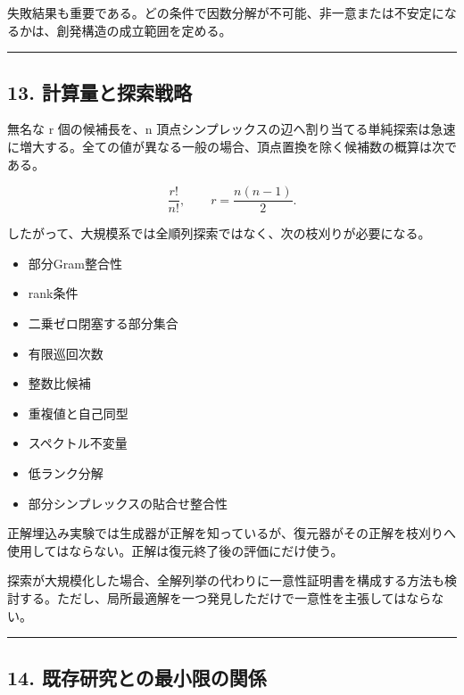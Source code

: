 \documentclass[
  a4paper,
]{ltjsarticle}
\providecommand{\tightlist}{%
  \setlength{\itemsep}{0pt}\setlength{\parskip}{0pt}}
\begin{document}
失敗結果も重要である。どの条件で因数分解が不可能、非一意または不安定になるかは、創発構造の成立範囲を定める。

\begin{center}\rule{0.5\linewidth}{0.5pt}\end{center}

\subsection{13.
計算量と探索戦略}\label{ux8a08ux7b97ux91cfux3068ux63a2ux7d22ux6226ux7565}

無名な r 個の候補長を、n
頂点シンプレックスの辺へ割り当てる単純探索は急速に増大する。全ての値が異なる一般の場合、頂点置換を除く候補数の概算は次である。

\[
\frac{r!}{n!},
\qquad
r=\frac{n(n-1)}{2}.
\]

したがって、大規模系では全順列探索ではなく、次の枝刈りが必要になる。

\begin{itemize}
\tightlist
\item
  部分Gram整合性
\item
  rank条件
\item
  二乗ゼロ閉塞する部分集合
\item
  有限巡回次数
\item
  整数比候補
\item
  重複値と自己同型
\item
  スペクトル不変量
\item
  低ランク分解
\item
  部分シンプレックスの貼合せ整合性
\end{itemize}

正解埋込み実験では生成器が正解を知っているが、復元器がその正解を枝刈りへ使用してはならない。正解は復元終了後の評価にだけ使う。

探索が大規模化した場合、全解列挙の代わりに一意性証明書を構成する方法も検討する。ただし、局所最適解を一つ発見しただけで一意性を主張してはならない。

\begin{center}\rule{0.5\linewidth}{0.5pt}\end{center}

\subsection{14.
既存研究との最小限の関係}\label{ux65e2ux5b58ux7814ux7a76ux3068ux306eux6700ux5c0fux9650ux306eux95a2ux4fc2}
\end{document}
